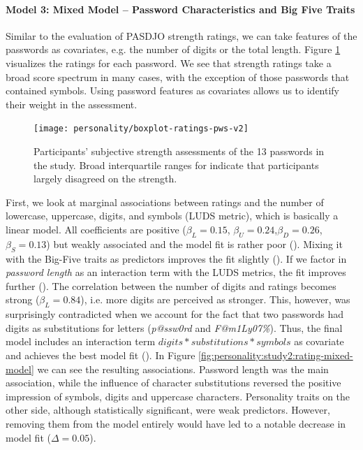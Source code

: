 \paragraph{Model 3: Mixed Model -- Password Characteristics and Big Five Traits}
Similar to the evaluation of PASDJO strength ratings, we can take features of the passwords as covariates, e.g. the number of digits or the total length. Figure \ref{fig:personality:study2:boxplot-ratings-pws} visualizes the ratings for each password. We see that strength ratings take a broad score spectrum in many cases, with the exception of those passwords that contained symbols. Using password features as covariates allows us to identify their weight in the assessment. 

\begin{figure}[htbp]
	\centering
	\texttt{[image: personality/boxplot-ratings-pws-v2]}
	\caption{\label{fig:personality:study2:boxplot-ratings-pws}Participants' subjective strength assessments of the 13 passwords in the study. Broad interquartile ranges for indicate that participants largely disagreed on the strength.}
\end{figure}

\makeatletter
First, we look at marginal associations between ratings and the number of lowercase, uppercase, digits, and symbols (LUDS metric), which is basically a linear model. All coefficients are positive ($\beta_{L} = 0.15$, $\beta_{U} = 0.24$,$\beta_{D} = 0.26$,$\beta_{S} = 0.13$) but weakly associated and the model fit is rather poor (). Mixing it with the Big-Five traits as predictors improves the fit slightly (). If we factor in \textit{password length} as an interaction term with the LUDS metrics, the fit improves further (). The correlation between the number of digits and ratings becomes strong ($\beta_{L} = 0.84$), i.e. more digits are perceived as stronger. This, however, was surprisingly contradicted when we account for the fact that two passwords had digits as substitutions for letters (\textit{p@ssw0rd} and \textit{F@m1Ly07\%}). Thus, the final model includes an interaction term $digits*substitutions*symbols$ as covariate and achieves the best model fit (). In Figure \ref{fig:personality:study2:rating-mixed-model} we can see the resulting associations. Password length was the main association, while the influence of character substitutions reversed the positive impression of symbols, digits and uppercase characters.
Personality traits on the other side, although statistically significant, were weak predictors. However, removing them from the model entirely would have led to a notable decrease in model fit ($\Delta=0.05$). 

